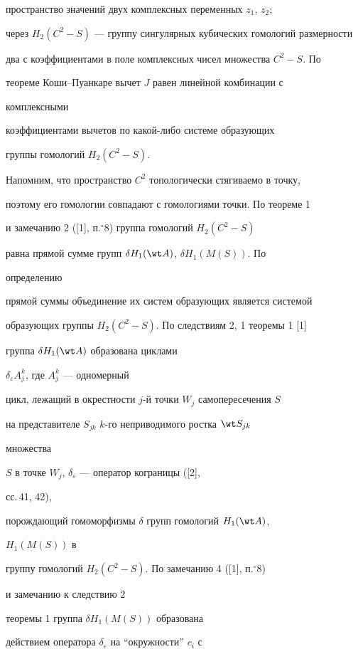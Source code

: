 пространство значений двух комплексных переменных $z_1$, $z_2$; 


через $H_2(C^2-S)$ --- группу сингулярных кубических гомологий размерности 


два с коэффициентами в поле комплексных чисел множества $C^2-S$. По 


теореме Коши--Пуанкаре вычет $J$ равен линейной комбинации с 


комплексными 


коэффициентами вычетов по какой-либо системе образующих  


группы гомологий $H_2(C^2-S)$. 


 


Напомним, что пространство $C^2$ топологически стягиваемо в точку, 


поэтому его гомологии совпадают с гомологиями точки. По теореме 1 


и замечанию 2 ([1], п.${}^\circ$8) группа гомологий $H_2(C^2-S)$ 


равна прямой сумме групп $\delta H_1(\wt A)$, $\delta H_1(M(S))$. По 


определению  


прямой суммы объединение их систем образующих является системой 


образующих группы $H_2(C^2-S)$. По следствиям 2, 1 теоремы 1 [1] 


группа $\delta H_1(\wt A)$ образована циклами 


$\delta_\varepsilon A^k_j$, где $A^k_j$ --- одномерный 


цикл, лежащий в окрестности $j$-й точки $W_j$ самопересечения $S$ 


на представителе $S_{jk}$\; $k$-го неприводимого ростка $\wt S_{jk}$ 


множества 


$S$ в точке $W_j$, $\delta_\varepsilon$ --- оператор кограницы ([2], 


сс.\,41, 42), 


порождающий гомоморфизмы $\delta$ групп гомологий $H_1(\wt A)$, 


$H_1(M(S))$ в 


группу гомологий $H_2(C^2-S)$. По замечанию 4 ([1], п.${}^\circ$8) 


и замечанию к следствию 2 


теоремы 1 группа $\delta H_1(M(S))$ образована  


действием оператора $\delta_\varepsilon$ на ``окружности'' $c_i$ с 


